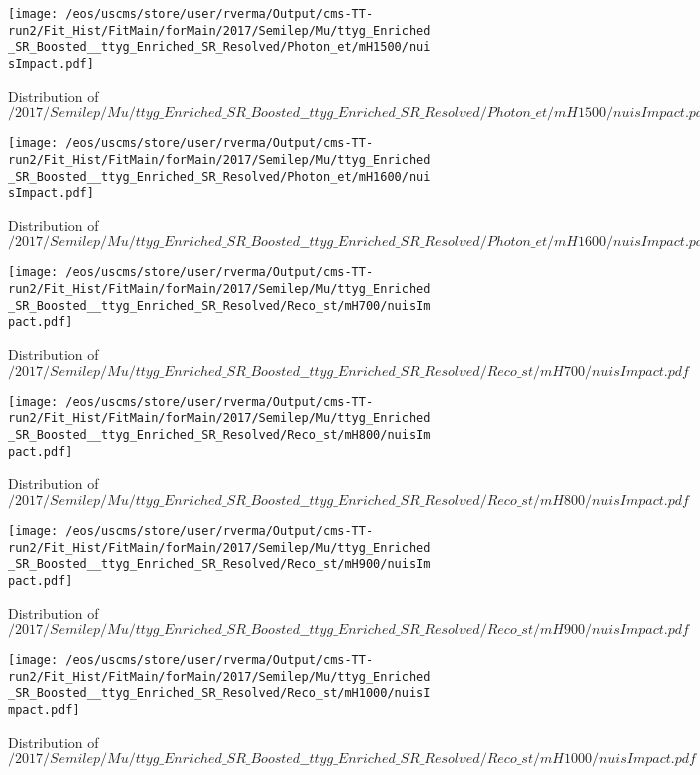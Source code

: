 \begin{figure}
\centering
\texttt{[image: /eos/uscms/store/user/rverma/Output/cms-TT-run2/Fit\_Hist/FitMain/forMain/2017/Semilep/Mu/ttyg\_Enriched\_SR\_Boosted\_\_ttyg\_Enriched\_SR\_Resolved/Photon\_et/mH1500/nuisImpact.pdf]}
\caption{Distribution of $/2017/Semilep/Mu/ttyg\_Enriched\_SR\_Boosted\_\_ttyg\_Enriched\_SR\_Resolved/Photon\_et/mH1500/nuisImpact.pdf$}
\end{figure}

\begin{figure}
\centering
\texttt{[image: /eos/uscms/store/user/rverma/Output/cms-TT-run2/Fit\_Hist/FitMain/forMain/2017/Semilep/Mu/ttyg\_Enriched\_SR\_Boosted\_\_ttyg\_Enriched\_SR\_Resolved/Photon\_et/mH1600/nuisImpact.pdf]}
\caption{Distribution of $/2017/Semilep/Mu/ttyg\_Enriched\_SR\_Boosted\_\_ttyg\_Enriched\_SR\_Resolved/Photon\_et/mH1600/nuisImpact.pdf$}
\end{figure}

\begin{figure}
\centering
\texttt{[image: /eos/uscms/store/user/rverma/Output/cms-TT-run2/Fit\_Hist/FitMain/forMain/2017/Semilep/Mu/ttyg\_Enriched\_SR\_Boosted\_\_ttyg\_Enriched\_SR\_Resolved/Reco\_st/mH700/nuisImpact.pdf]}
\caption{Distribution of $/2017/Semilep/Mu/ttyg\_Enriched\_SR\_Boosted\_\_ttyg\_Enriched\_SR\_Resolved/Reco\_st/mH700/nuisImpact.pdf$}
\end{figure}

\begin{figure}
\centering
\texttt{[image: /eos/uscms/store/user/rverma/Output/cms-TT-run2/Fit\_Hist/FitMain/forMain/2017/Semilep/Mu/ttyg\_Enriched\_SR\_Boosted\_\_ttyg\_Enriched\_SR\_Resolved/Reco\_st/mH800/nuisImpact.pdf]}
\caption{Distribution of $/2017/Semilep/Mu/ttyg\_Enriched\_SR\_Boosted\_\_ttyg\_Enriched\_SR\_Resolved/Reco\_st/mH800/nuisImpact.pdf$}
\end{figure}

\begin{figure}
\centering
\texttt{[image: /eos/uscms/store/user/rverma/Output/cms-TT-run2/Fit\_Hist/FitMain/forMain/2017/Semilep/Mu/ttyg\_Enriched\_SR\_Boosted\_\_ttyg\_Enriched\_SR\_Resolved/Reco\_st/mH900/nuisImpact.pdf]}
\caption{Distribution of $/2017/Semilep/Mu/ttyg\_Enriched\_SR\_Boosted\_\_ttyg\_Enriched\_SR\_Resolved/Reco\_st/mH900/nuisImpact.pdf$}
\end{figure}

\begin{figure}
\centering
\texttt{[image: /eos/uscms/store/user/rverma/Output/cms-TT-run2/Fit\_Hist/FitMain/forMain/2017/Semilep/Mu/ttyg\_Enriched\_SR\_Boosted\_\_ttyg\_Enriched\_SR\_Resolved/Reco\_st/mH1000/nuisImpact.pdf]}
\caption{Distribution of $/2017/Semilep/Mu/ttyg\_Enriched\_SR\_Boosted\_\_ttyg\_Enriched\_SR\_Resolved/Reco\_st/mH1000/nuisImpact.pdf$}
\end{figure}

